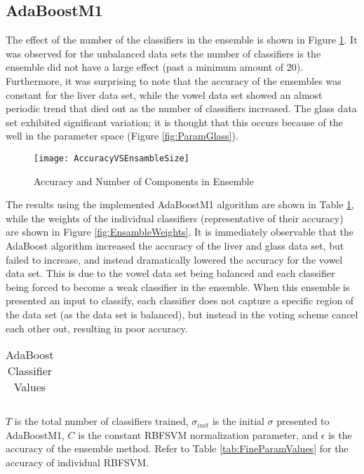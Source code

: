 \subsection{AdaBoostM1}
\label{sec:Results_AdaBoost}
The effect of the number of the classifiers in the ensemble is shown in Figure \ref{fig:AccuracyEnsambleSize}.
It was observed for the unbalanced data sets the number of classifiers is the ensemble did not have a large effect (past a minimum amount of 20).
Furthermore, it was surprising to note that the accuracy of the ensembles was constant for the liver data set, while the vowel data set showed an almost periodic trend that died out as the number of classifiers increased.
The glass data set exhibited significant variation; it is thought that this occurs because of the well in the parameter space (Figure \ref{fig:ParamGlass}).
\begin{figure}[!ht]
    \centering
    \texttt{[image: AccuracyVSEnsambleSize]}
    \caption{Accuracy and Number of Components in Ensemble}
    \label{fig:AccuracyEnsambleSize}
\end{figure}

The results using the implemented AdaBoostM1 algorithm are shown in Table \ref{tab:AdaBoostValues}, while the weights of the individual classifiers (representative of their accuracy) are shown in Figure \ref{fig:EnsambleWeights}.
It is immediately observable that the AdaBoost algorithm increased the accuracy of the liver and glass data set, but failed to increase, and instead dramatically lowered the accuracy for the vowel data set.
This is due to the vowel data set being balanced and each classifier being forced to become a weak classifier in the ensemble.
When this ensemble  is presented an input to classify, each classifier does not capture a specific region of the data set (as the data set is balanced), but instead in the voting scheme cancel each other out, resulting in poor accuracy.
\begin{table}[!ht]
\caption{AdaBoost Classifier Values}
\label{tab:AdaBoostValues}
\begin{center}
\begin{tabular}{c c c c c}
\hline

\\
\hline

\hline
\end{tabular}
\end{center}

\normalsize
$T$ is the total number of classifiers trained, $\sigma_{init}$ is the initial $\sigma$ presented to AdaBoostM1, $C$ is the constant RBFSVM normalization parameter, and $\epsilon$ is the accuracy of the ensemble method.  Refer to Table \ref{tab:FineParamValues} for the accuracy of individual RBFSVM.
\end{table}

